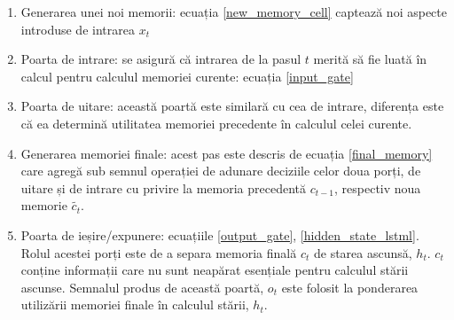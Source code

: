 \begin{enumerate}
	\item Generarea unei noi memorii: ecuația \ref{new_memory_cell} captează noi aspecte introduse de intrarea $x_t$
	\item Poarta de intrare: se asigură că intrarea de la pasul $t$ merită să fie luată în calcul pentru calculul memoriei curente: ecuația \ref{input_gate}
	\item Poarta de uitare: această poartă este similară cu cea de intrare, diferența este că ea determină utilitatea memoriei precedente în calculul celei curente.
	\item Generarea memoriei finale: acest pas este descris de ecuația \ref{final_memory} care agregă sub semnul operației de adunare deciziile celor doua porți, de uitare și de intrare cu privire la memoria precedentă $c_{t-1}$, respectiv noua memorie $\widetilde{c_t}$.
	\item Poarta de ieșire/expunere: ecuațiile \ref{output_gate}, \ref{hidden_state_lstml}. Rolul acestei porți este de a separa memoria finală $c_{t}$ de starea ascunsă, $h_{t}$. $c_{t}$ conține informații care nu sunt neapărat esențiale pentru calculul stării ascunse. Semnalul produs de această poartă, $o_t$ este folosit la ponderarea utilizării memoriei finale în calculul stării, $h_t$.
\end{enumerate}































